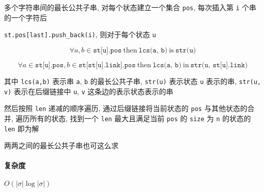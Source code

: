 多个字符串间的最长公共子串, 对每个状态建立一个集合 \verb|pos|, 每次插入第 \verb|i| 个串的一个字符后

\verb|st.pos[last].push_back(i)|, 则对于每个状态 \verb|u|

\[
    \forall a,b \in \texttt{st[u].pos}~\text{then}~\texttt{lcs(a, b)}~\text{is}~\texttt{str(u)}
\]

\[
    \forall a\in \texttt{st[u].pos}, b\in \texttt{st[st[u].link].pos}~\text{then}~\texttt{lcs(a, b)} ~\text{in}~ \texttt{str(u, st[u].link)}
\]

其中 \verb|lcs(a,b)| 表示串 \verb|a|, \verb|b| 的最长公共子串, \verb|str(u)| 表示状态 \verb|u| 表示的串, \verb|str(u, v)| 表示在后缀链接中 \verb|u|, \verb|v| 这条边的表示状态表示的串

然后按照 \verb|len| 递减的顺序遍历, 通过后缀链接将当前状态的 \verb|pos| 与其他状态的合并, 遍历所有的状态, 找到一个 \verb|len| 最大且满足当前 \verb|pos| 的 \verb|size| 为 \verb|n| 的状态的 \verb|len| 即为解

两两之间的最长公共子串也可这么求

\paragraph{复杂度}

\(O(|\sigma| \log|\sigma|)\)
